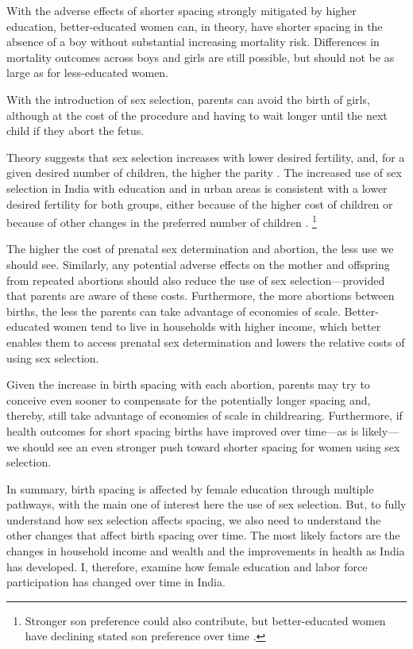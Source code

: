 \documentclass[12pt,letterpaper]{article}
\begin{document}
With the adverse effects of shorter spacing strongly mitigated by higher education,
better-educated women can, in theory, have shorter spacing in the absence of a boy 
without substantial increasing mortality risk.
Differences in mortality outcomes across boys and girls are still possible,
but should not be as large as for less-educated women.

With the introduction of sex selection, parents can avoid the birth of girls, 
although at the cost of the procedure and having to wait longer until 
the next child if they abort the fetus.

Theory suggests that sex selection increases with lower desired fertility, and, for a 
given desired number of children, the higher the parity \citep{Portner2015b}.
The increased use of sex selection in India with education and in urban
areas is consistent with a lower desired fertility for both groups,
either because of the higher cost of children or because of other
changes in the preferred number of children
\citep{das_gupta97,retherford03b,jha06,Guilmoto2009a,Bongaarts2013,Portner2015b,
Jayachandran2017}.%
\footnote{
Stronger son preference could also contribute, but better-educated women 
have declining stated son preference over time \citep{bhat03,pande07}.
}

The higher the cost of prenatal sex determination and abortion, the less use we should 
see.
Similarly, any potential adverse effects on the mother and offspring 
from repeated abortions should also reduce the use of sex selection---provided that 
parents are aware of these costs.
Furthermore, the more abortions between births, the less the parents can take advantage 
of economies of scale.
Better-educated women tend to live in households with higher income, which better enables 
them to access prenatal sex determination and lowers the relative costs of using sex 
selection.

Given the increase in birth spacing with each abortion, parents may try to 
conceive even sooner to compensate for the potentially longer spacing and, 
thereby, still take advantage of economies of scale in childrearing.
Furthermore, if health outcomes for short spacing births have improved over 
time---as is likely---we should see an even stronger push toward shorter 
spacing for women using sex selection.

In summary, birth spacing is affected by female education through 
multiple pathways, with the main one of interest here the use of 
sex selection. 
But, to fully understand how sex selection affects spacing, we also 
need to understand the other changes that affect birth spacing over time.
The most likely factors are the changes in household income and 
wealth and the improvements in health as India has developed.
I, therefore, examine how female education and labor force 
participation has changed over time in India.
\end{document}
